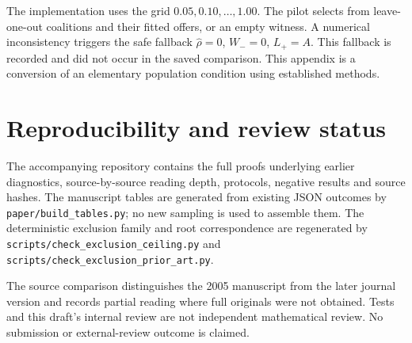 \documentclass[11pt,a4paper]{article}
\theoremstyle{remark}
\begin{document}
The implementation uses the grid $0.05,0.10,\ldots,1.00$.
The pilot selects from leave-one-out coalitions and their
fitted offers, or an empty witness. A numerical inconsistency
triggers the safe fallback $\widehat\rho=0$, $W_-=0$,
$L_+=A$. This fallback is recorded and did not occur in
the saved comparison. This appendix is a conversion of an
elementary population condition using established methods.

\section{Reproducibility and review status}\label{app:reproduce}

The accompanying repository contains the full proofs underlying
earlier diagnostics, source-by-source reading depth, protocols,
negative results and source hashes. The manuscript tables are
generated from existing JSON outcomes by
\texttt{paper/build\_tables.py}; no new sampling is used to
assemble them. The deterministic exclusion family and root
correspondence are regenerated by
\texttt{scripts/check\_exclusion\_ceiling.py} and
\texttt{scripts/check\_exclusion\_prior\_art.py}.

The source comparison distinguishes the 2005 manuscript from
the later journal version and records partial reading where
full originals were not obtained. Tests and this draft's
internal review are not independent mathematical review.
No submission or external-review outcome is claimed.



\end{document}
